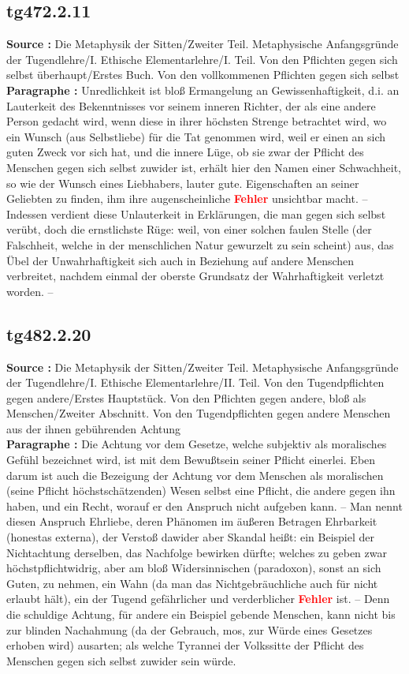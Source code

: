 \documentclass[a4paper,12pt,twoside]{book}
\newcommand{\match}[1]{\textcolor{red}{\textbf{#1}}}
\begin{document}
	\subsection*{tg472.2.11} 
	\textbf{Source : }Die Metaphysik der Sitten/Zweiter Teil. Metaphysische Anfangsgründe der Tugendlehre/I. Ethische Elementarlehre/I. Teil. Von den Pflichten gegen sich selbst überhaupt/Erstes Buch. Von den vollkommenen Pflichten gegen sich selbst\\  
	
	\textbf{Paragraphe : }Unredlichkeit ist bloß Ermangelung an Gewissenhaftigkeit, d.i. an Lauterkeit des Bekenntnisses vor seinem inneren Richter, der als eine andere Person gedacht wird, wenn diese in ihrer höchsten Strenge betrachtet wird, wo ein Wunsch (aus Selbstliebe) für die Tat genommen wird, weil er einen an sich guten Zweck vor sich hat, und die innere Lüge, ob sie zwar der Pflicht des Menschen gegen sich selbst zuwider ist, erhält hier den Namen einer Schwachheit, so wie der Wunsch eines Liebhabers, lauter gute. Eigenschaften an seiner Geliebten zu finden, ihm ihre augenscheinliche \match{Fehler} unsichtbar macht. – Indessen verdient diese Unlauterkeit in Erklärungen, die man gegen sich selbst verübt, doch die ernstlichste Rüge: weil, von einer solchen faulen Stelle (der Falschheit, welche in der menschlichen Natur gewurzelt zu sein scheint) aus, das Übel der Unwahrhaftigkeit sich auch in Beziehung auf andere Menschen verbreitet, nachdem einmal der oberste Grundsatz der Wahrhaftigkeit verletzt worden. – 
	
	\subsection*{tg482.2.20} 
	\textbf{Source : }Die Metaphysik der Sitten/Zweiter Teil. Metaphysische Anfangsgründe der Tugendlehre/I. Ethische Elementarlehre/II. Teil. Von den Tugendpflichten gegen andere/Erstes Hauptstück. Von den Pflichten gegen andere, bloß als Menschen/Zweiter Abschnitt. Von den Tugendpflichten gegen andere Menschen aus der ihnen gebührenden Achtung\\  
	
	\textbf{Paragraphe : }Die Achtung vor dem Gesetze, welche subjektiv als moralisches Gefühl bezeichnet wird, ist mit dem Bewußtsein seiner Pflicht einerlei. Eben darum ist auch die Bezeigung der Achtung vor dem Menschen als moralischen (seine Pflicht höchstschätzenden) Wesen selbst eine Pflicht, die andere gegen ihn haben, und ein Recht, worauf er den Anspruch nicht aufgeben kann. – Man nennt diesen Anspruch Ehrliebe, deren Phänomen im äußeren Betragen Ehrbarkeit (honestas externa), der Verstoß dawider aber Skandal heißt: ein Beispiel der Nichtachtung derselben, das Nachfolge bewirken dürfte; welches zu geben zwar höchstpflichtwidrig, aber am bloß Widersinnischen (paradoxon),  sonst an sich Guten, zu nehmen, ein Wahn (da man das Nichtgebräuchliche auch für nicht erlaubt hält), ein der Tugend gefährlicher und verderblicher \match{Fehler} ist. – Denn die schuldige Achtung, für andere ein Beispiel gebende Menschen, kann nicht bis zur blinden Nachahmung (da der Gebrauch, mos, zur Würde eines Gesetzes erhoben wird) ausarten; als welche Tyrannei der Volkssitte der Pflicht des Menschen gegen sich selbst zuwider sein würde. 
	
\end{document}
